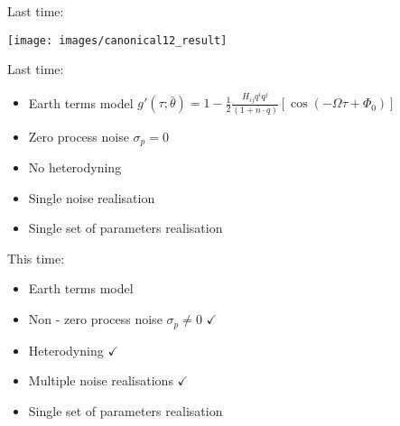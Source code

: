 \documentclass[10pt]{beamer}
\title{}
\subtitle{}
\author{}
\date{EE/GW meeting, June 1, 2023}
\begin{document}
	
	\maketitle
	
	\begin{frame}{}
		
		Last time: 
		
\texttt{[image: images/canonical12\_result]}


\end{frame}


	\begin{frame}{}
	
	Last time: 
	
	\begin{itemize}
		\item Earth terms model $g'(\tau; \bar{\theta}) = 1 - \frac{1}{2} \frac{ H_{ij}q^i q^j }{(1 + \bar{n}\cdot \bar{q}) } \left[ \cos(-\Omega \tau +\Phi_0) \right]$
		\item Zero process noise  $\sigma_p = 0$
		\item No heterodyning
		\item Single noise realisation
		\item Single set of parameters realisation
    \end{itemize}	

\end{frame}



	\begin{frame}{}
	
	This time: 
	
	\begin{itemize}
		\item Earth terms model 
		\item \alert{Non - zero process noise  $\sigma_p \neq 0$} $\checkmark$
		\item \alert{Heterodyning} $\checkmark$
		\item \alert{Multiple noise realisations} $\checkmark$
		\item Single set of parameters realisation
	\end{itemize}	
	
\end{frame}
\end{document}
